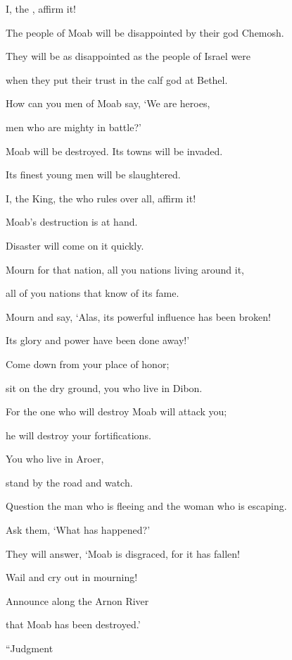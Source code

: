 {\par }{\Q I,
the {}, affirm it!
\par }{\Q {}The people of Moab
will be disappointed
by their god Chemosh.
\par }{\Q They will be as
disappointed
as the people of Israel
were
\par }{\Q when they put their trust
in the calf god at Bethel.
\par }{\Q {}How
can you men of Moab say,
‘We
are heroes,
\par }{\Q men
who are mighty
in battle?’
\par }{\Q {}Moab
will be destroyed.
Its towns
will be invaded.
\par }{\Q Its finest
young men
will be slaughtered.
\par }{\Q I, the King,
the {}
who rules over all,
affirm it!
\par }{\Q {}Moab’s
destruction
is at hand.
\par }{\Q Disaster
will come
on it quickly.
\par }{\Q {}Mourn
for that nation, all
you nations living around
it,
\par }{\Q all
of you nations that know
of its fame.
\par }{\Q Mourn and say,
‘Alas,
its powerful
influence
has been broken!
\par }{\Q Its glory
and power have been done away!’
\par }{\Q {}Come down
from your place of honor;
\par }{\Q sit
on the dry ground,
you who live
in Dibon.
\par }{\Q For
the one who will destroy
Moab
will attack
you;
\par }{\Q he will destroy
your fortifications.
\par }{\Q {}You who live
in Aroer,
\par }{\Q stand
by the road
and watch.
\par }{\Q Question
the man who is fleeing
and the woman who
is escaping.
\par }{\Q Ask
them, ‘What
has happened?’
\par }{\Q {}They will answer, ‘Moab
is disgraced,
for
it has fallen!
\par }{\Q Wail
and cry out
in mourning!
\par }{\Q Announce
along the Arnon
River
\par }{\Q that
Moab
has been destroyed.’
\par }{\PP {}“Judgment
}
